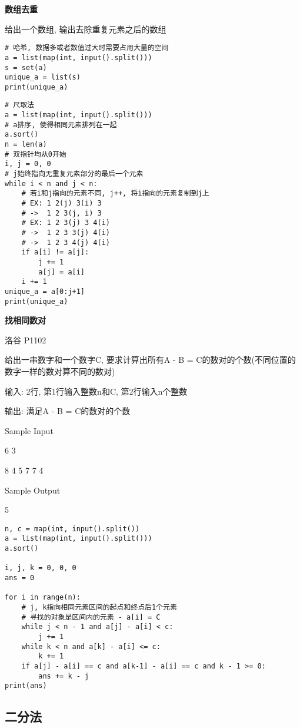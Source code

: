 \documentclass[../main]{subfiles}
\begin{document}
\begin{sloppy}
\textbf{数组去重}

给出一个数组, 输出去除重复元素之后的数组

\begin{lstlisting}[style = Python]
# 哈希, 数据多或者数值过大时需要占用大量的空间
a = list(map(int, input().split()))
s = set(a)
unique_a = list(s)
print(unique_a)
\end{lstlisting}

\begin{lstlisting}[style = Python]
# 尺取法
a = list(map(int, input().split()))
# a排序, 使得相同元素排列在一起
a.sort()
n = len(a)
# 双指针均从0开始
i, j = 0, 0
# j始终指向无重复元素部分的最后一个元素
while i < n and j < n:
    # 若i和j指向的元素不同, j++, 将i指向的元素复制到j上
    # EX: 1 2(j) 3(i) 3
    # ->  1 2 3(j, i) 3
    # EX: 1 2 3(j) 3 4(i) 
    # ->  1 2 3 3(j) 4(i)
    # ->  1 2 3 4(j) 4(i)
    if a[i] != a[j]:
        j += 1
        a[j] = a[i]
    i += 1
unique_a = a[0:j+1]
print(unique_a)
\end{lstlisting}

\newpage
\textbf{找相同数对}

洛谷 P1102

给出一串数字和一个数字C, 要求计算出所有A - B = C的数对的个数(不同位置的数字一样的数对算不同的数对)

输入: 2行, 第1行输入整数n和C, 第2行输入n个整数

输出: 满足A - B = C的数对的个数

Sample Input 

6 3

8 4 5 7 7 4

Sample Output

5

\begin{lstlisting}[style = Python]
n, c = map(int, input().split())
a = list(map(int, input().split()))
a.sort()

i, j, k = 0, 0, 0
ans = 0

for i in range(n):
    # j, k指向相同元素区间的起点和终点后1个元素
    # 寻找的对象是区间内的元素 - a[i] = C
    while j < n - 1 and a[j] - a[i] < c:
        j += 1
    while k < n and a[k] - a[i] <= c:
        k += 1
    if a[j] - a[i] == c and a[k-1] - a[i] == c and k - 1 >= 0:
        ans += k - j
print(ans)
\end{lstlisting}

\newpage

\subsection{二分法}


\end{sloppy}
\end{document}
